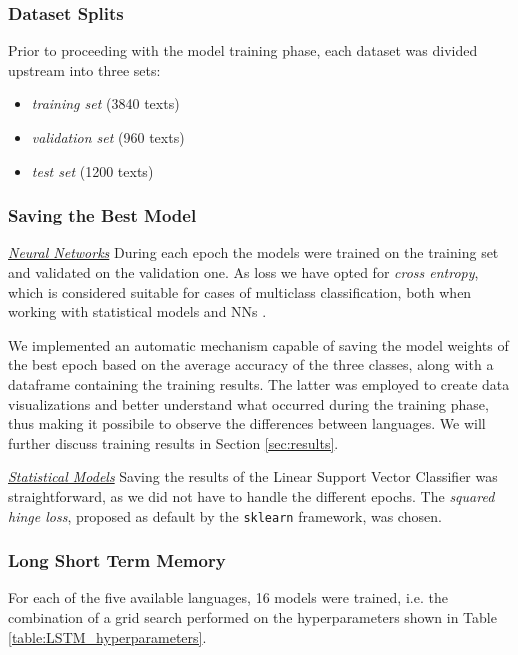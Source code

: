 \documentclass[letterpaper,11pt]{article}
\begin{document}
\subsubsection*{Dataset Splits}

Prior to proceeding with the model training phase, each dataset was divided upstream into three sets: 
\begin{itemize}
  \item \textit{training set} (3840 texts)
  \item \textit{validation set} (960 texts)
  \item \textit{test set} (1200 texts)
\end{itemize}

\subsubsection*{Saving the Best Model}

\underline{\textit{Neural Networks}} During each epoch the models were trained on the training set and validated on the validation one. As loss we have opted for \textit{cross entropy}, which is considered suitable for cases of multiclass classification, both when working with statistical models and NNs \cite{cross_entropy}.

We implemented an automatic mechanism capable of saving the model weights of the best epoch based on the average accuracy of the three classes, along with a dataframe containing the training results. The latter was employed to create data visualizations and better understand what occurred during the training phase, thus making it possibile to observe the differences between languages. We will further discuss training results in Section \ref{sec:results}.

\underline{\textit{Statistical Models}} Saving the results of the Linear Support Vector Classifier was straightforward, as we did not have to handle the different epochs. The \textit{squared hinge loss}, proposed as default by the \verb|sklearn| framework, was chosen.

\subsubsection*{Long Short Term Memory}

For each of the five available languages, 16 models were trained, i.e. the combination of a grid search performed on the hyperparameters shown in Table \ref{table:LSTM_hyperparameters}.
\end{document}
